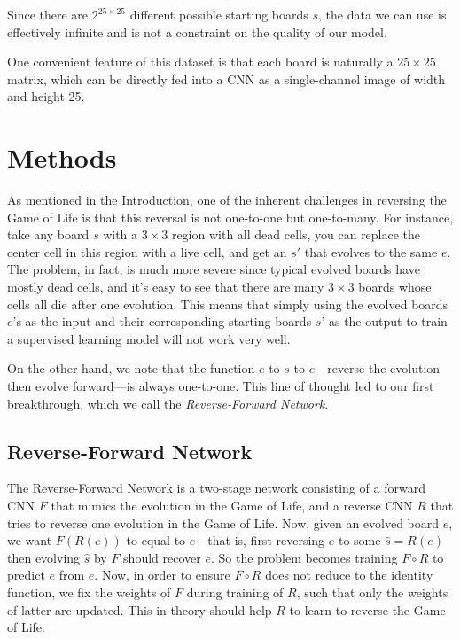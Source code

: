 \documentclass[conference]{IEEEtran}
\begin{document}
Since there are $2^{25 \times 25}$ different possible starting boards $s$, the data we can use is effectively infinite and is not a constraint on the quality of our model.

One convenient feature of this dataset is that each board is naturally a $25 \times 25$ matrix, which can be directly fed into a CNN as a single-channel image of width and height 25.

\section{Methods}
As mentioned in the Introduction, one of the inherent challenges in reversing the Game of Life is that this reversal is not one-to-one but one-to-many. For instance, take any board $s$ with a $3 \times 3$ region with all dead cells, you can replace the center cell in this region with a live cell, and get an $s'$ that evolves to the same $e$. The problem, in fact, is much more severe since typical evolved boards have mostly dead cells, and it's easy to see that there are many $3 \times 3$ boards whose cells all die after one evolution. This means that simply using the evolved boards $e$'s as the input and their corresponding starting boards $s$' as the output to train a supervised learning model will not work very well.

On the other hand, we note that the function $e$ to $s$ to $e$---reverse the evolution then evolve forward---is always one-to-one. This line of thought led to our first breakthrough, which we call the \emph{Reverse-Forward Network}.

\subsection{Reverse-Forward Network}
\label{revfwdnet}
The Reverse-Forward Network is a two-stage network consisting of a forward CNN $F$ that mimics the evolution in the Game of Life, and a reverse CNN $R$ that tries to reverse one evolution in the Game of Life. Now, given an evolved board $e$, we want $F(R(e))$ to equal to $e$---that is, first reversing $e$ to some $\hat s = R(e)$ then evolving $\hat s$ by $F$ should recover $e$. So the problem becomes training $F \circ R$ to predict $e$ from $e$. Now, in order to ensure $F \circ R$ does not reduce to the identity function, we fix the weights of $F$ during training of $R$, such that only the weights of latter are updated. This in theory should help $R$ to learn to reverse the Game of Life.
\end{document}
